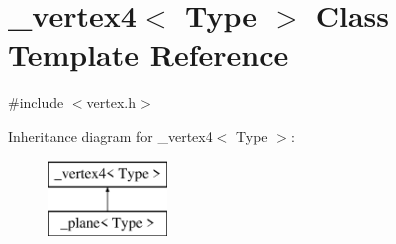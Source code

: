 \hypertarget{class__vertex4}{\section{\+\_\+vertex4$<$ Type $>$ Class Template Reference}
\label{class__vertex4}
}


{\ttfamily \#include $<$vertex.\+h$>$}

Inheritance diagram for \+\_\+vertex4$<$ Type $>$\+:\begin{figure}[H]
\begin{center}
\leavevmode
\includegraphics[height=2.000000cm]{class__vertex4}
\end{center}
\end{figure}
